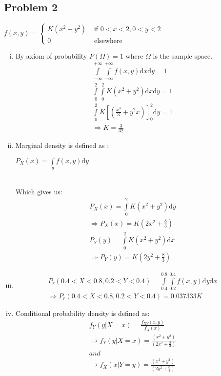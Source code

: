 \documentclass{article}
\begin{document}
\subsection{Problem 2} %
\label{sub:problem_2}
$f(x, y) = 
\begin{cases}
    K(x^2+y^2) &\text{ if } 0<x<2, 0<y<2\\
    0 &\text{ elsewhere }
\end{cases}$
\begin{enumerate}[(i)]
    \item By axiom of probability $P(\Omega) = 1$ where $\Omega$ is the sample space.\\
    \begin{align}
    \int \limits_{-\infty}^{+\infty} \int \limits_{-\infty}^{+\infty} f(x,y) \mathrm{d} x \mathrm{d} y = 1\\ \nonumber
    \int \limits_{0}^{2} \int \limits_{0}^{2} K(x^2+y^2) \mathrm{d} x \mathrm{d} y = 1\\ \nonumber
    \int \limits_{0}^{2} K[(\frac{x^3}{3}+y^2x)]_0^2 \mathrm{d} y = 1\\ \nonumber
    \Longrightarrow K = \frac{3}{32} \nonumber
    \end{align}

    \item Marginal density is defined as :\\
    \centerline{$P_{X}(x) =  \int \limits_{y} f(x, y) \mathrm{d} y$}\\
    Which gives us:\\
    \begin{align}
        P_{X}(x) =  \int \limits_{0}^{2} K(x^2+ y^2) \mathrm{d} y \\\nonumber
        \Longrightarrow P_{X}(x) = K(2x^2 + \frac{8}{3})\\ \nonumber
        P_{Y}(y) =  \int \limits_{0}^{2} K(x^2+ y^2) \mathrm{d} x \\\nonumber
        \Longrightarrow P_{Y}(y) = K(2y^2 + \frac{8}{3}) \nonumber
    \end{align}
    \item 
    \begin{align}
        P_{r}(0.4<X<0.8, 0.2<Y<0.4) = \int \limits_{0.4}^{0.8} \int \limits_{0.2}^{0.4} f(x,y) \mathrm{d} y \mathrm{d} x \\ \nonumber
        \Longrightarrow P_{r}(0.4<X<0.8, 0.2<Y<0.4) = 0.037333K \nonumber
    \end{align}
    \item Conditional probability density is defined as:\\
    \begin{align}
        f_{Y}(y|X = x) = \frac{f_{XY}(x,y)}{f_{X}(x)}\\
        \rightarrow f_{Y}(y|X = x) = \frac{(x^2 + y^2)}{(2x^2 + \frac{8}{3})} \nonumber\\ 
        and\\
        \rightarrow f_{X}(x|Y = y) = \frac{(x^2 + y^2)}{(2y^2 + \frac{8}{3})} \nonumber
    \end{align}


\end{enumerate}
\end{document}
